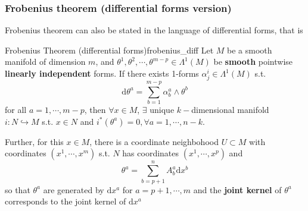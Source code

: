 \subsubsection*{Frobenius theorem (differential forms version)}
Frobenius theorem can also be stated in the language of differential forms, that is 
\begin{theorem}{Frobenius Theorem (differential forms)}{frobenius_diff}
    Let $M$ be a smooth manifold of dimension $m$, and $\theta^1,\theta^2,\cdots,\theta^{m-p}\in \Lambda ^1(M)$ be \textbf{smooth} pointwise \textbf{linearly independent} forms. If there exists 1-forms $\alpha_j^i \in \Lambda^1 (M)$ s.t.   
    $$
    \mathrm{d}\theta^{a} = \sum^{m-p}_{b=1}\alpha_b^{a} \wedge \theta^b
    $$
    for all $a=1,\cdots,m-p$, then $\forall x\in M$, $\exists$ unique $k-$dimensional manifold $i: N\hookrightarrow M$ s.t. $x\in N$ and $i^*\left(\theta^a\right)=0,\forall a=1,\cdots,n-k$.

    Further, for this $x\in M$, there is a coordinate neighbohood $U\subset M$ with coordinates $\left(x^1,\cdots,x^m\right)$ s.t. $N$ has coordinates $\left(x^1,\cdots,x^p\right)$ and
    $$
    \theta^a = \sum^n_{b=p+1}A_b^a\mathrm{d}x^b
    $$
    so that $\theta^a$ are generated by $\mathrm{d}x^a$ for $a=p+1,\cdots,m$ and the \textbf{joint kernel} of $\theta^a$ corresponds to the joint kernel of $\mathrm{d}x^a$
\end{theorem}

